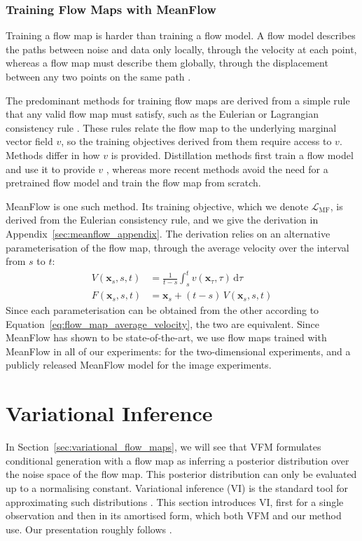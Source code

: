\documentclass[12pt,a4paper]{report}
\begin{document}
\subsubsection{Training Flow Maps with MeanFlow}
\label{subsubsec:meanflow}
Training a flow map is harder than training a flow model. A flow model describes the paths between noise and data only locally, through the velocity at each point, whereas a flow map must describe them globally, through the displacement between any two points on the same path \parencite{sander_MF}.

The predominant methods for training flow maps are derived from a simple rule that any valid flow map must satisfy, such as the Eulerian or Lagrangian consistency rule \parencite{sander_MF,boffi2025flowmapmatchingstochastic}. These rules relate the flow map to the underlying marginal vector field $v$, so the training objectives derived from them require access to $v$. Methods differ in how $v$ is provided. Distillation methods first train a flow model and use it to provide $v$ \parencite{song2023consistencymodels,boffi2025buildconsistencymodellearning}, whereas more recent methods avoid the need for a pretrained flow model and train the flow map from scratch.

MeanFlow \parencite{geng2025meanflowsonestepgenerative} is one such method. Its training objective, which we denote $\mathcal{L}_{\mathrm{MF}}$, is derived from the Eulerian consistency rule, and we give the derivation in Appendix~\ref{sec:meanflow_appendix}. The derivation relies on an alternative parameterisation of the flow map, through the average velocity over the interval from $s$ to $t$:
\begin{align}
V(\mathbf{x}_s,s,t)
&=
\frac{1}{t-s}\int_{s}^{t}v(\mathbf{x}_\tau,\tau)\,\mathrm{d}\tau
\label{eq:average_velocity}
\\
F(\mathbf{x}_s,s,t)
&=
\mathbf{x}_s+(t-s)\,V(\mathbf{x}_s,s,t)
\label{eq:flow_map_average_velocity}
\end{align}
Since each parameterisation can be obtained from the other according to Equation~\ref{eq:flow_map_average_velocity}, the two are equivalent. Since MeanFlow has shown to be state-of-the-art, we use flow maps trained with MeanFlow in all of our experiments: for the two-dimensional experiments, and a publicly released MeanFlow model for the image experiments.

\section{Variational Inference}
\label{sec:variational_inference}
In Section~\ref{sec:variational_flow_maps}, we will see that VFM formulates conditional generation with a flow map as inferring a posterior distribution over the noise space of the flow map. This posterior distribution can only be evaluated up to a normalising constant. Variational inference (VI) is the standard tool for approximating such distributions \parencite{Blei_2017}. This section introduces VI, first for a single observation and then in its amortised form, which both VFM and our method use. Our presentation roughly follows \textcite{pml2Book}.
\end{document}

